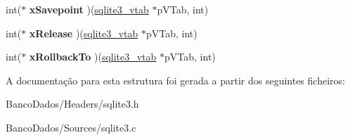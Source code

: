 \begin{DoxyCompactItemize}
\item 
\hypertarget{structsqlite3__module_af90f1df803fce1b90048864aeeeee890}{int($\ast$ {\bfseries x\-Savepoint} )(\hyperlink{structsqlite3__vtab}{sqlite3\-\_\-vtab} $\ast$p\-V\-Tab, int)}\label{structsqlite3__module_af90f1df803fce1b90048864aeeeee890}

\item 
\hypertarget{structsqlite3__module_a8dcaa6dc6d9563c8da57e4c8c5055609}{int($\ast$ {\bfseries x\-Release} )(\hyperlink{structsqlite3__vtab}{sqlite3\-\_\-vtab} $\ast$p\-V\-Tab, int)}\label{structsqlite3__module_a8dcaa6dc6d9563c8da57e4c8c5055609}

\item 
\hypertarget{structsqlite3__module_a767753c6c97d1f622e5113367a0547b5}{int($\ast$ {\bfseries x\-Rollback\-To} )(\hyperlink{structsqlite3__vtab}{sqlite3\-\_\-vtab} $\ast$p\-V\-Tab, int)}\label{structsqlite3__module_a767753c6c97d1f622e5113367a0547b5}

\end{DoxyCompactItemize}


A documentação para esta estrutura foi gerada a partir dos seguintes ficheiros\-:\begin{DoxyCompactItemize}
\item 
Banco\-Dados/\-Headers/sqlite3.\-h\item 
Banco\-Dados/\-Sources/sqlite3.\-c\end{DoxyCompactItemize}
